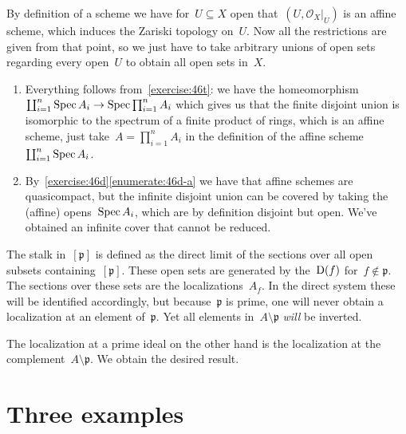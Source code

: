 \begin{exercise}
  By definition of a scheme we have for~$U\subseteq X$ open that~$(U,\mathcal{O}_X|_U)$ is an affine scheme, which induces the Zariski topology on~$U$. Now all the restrictions are given from that point, so we just have to take arbitrary unions of open sets regarding every open~$U$ to obtain all open sets in~$X$.
\end{exercise}

\begin{exercise}
  \begin{enumerate}
    \item Everything follows from~\autoref{exercise:46t}: we have the homeomorphism~$\coprod_{i=1}^n\operatorname{Spec} A_i\to\operatorname{Spec}\prod_{i=1}^nA_i$ which gives us that the finite disjoint union is isomorphic to the spectrum of a finite product of rings, which is an affine scheme, just take~$A=\prod_{i=1}^nA_i$ in the definition of the affine scheme~$\coprod_{i=1}^n\operatorname{Spec} A_i$.

    \item By~\autoref{exercise:46d}\ref{enumerate:46d-a} we have that affine schemes are quasicompact, but the infinite disjoint union can be covered by taking the (affine) opens~$\operatorname{Spec} A_i$, which are by definition disjoint but open. We've obtained an infinite cover that cannot be reduced.\qedhere
  \end{enumerate}
\end{exercise}

\begin{exercise}
  The stalk in~$[\mathfrak{p}]$ is defined as the direct limit of the sections over all open subsets containing~$[\mathfrak{p}]$. These open sets are generated by the~$\operatorname{D}(f)$ for~$f\notin\mathfrak{p}$. The sections over these sets are the localizations~$A_f$. In the direct system these will be identified accordingly, but because~$\mathfrak{p}$ is prime, one will never obtain a localization at an element of~$\mathfrak{p}$. Yet all elements in~$A\setminus\mathfrak{p}$ \emph{will} be inverted.
  
  The localization at a prime ideal on the other hand is the localization at the complement~$A\setminus\mathfrak{p}$. We obtain the desired result.
\end{exercise}


\section{Three examples}

